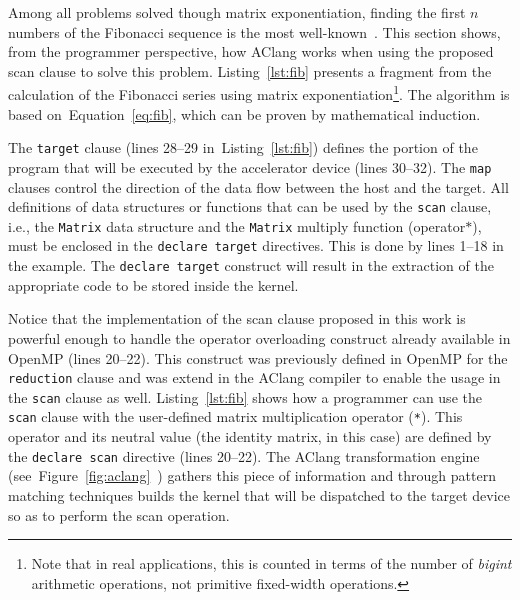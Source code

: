 \documentclass[Ingles]{ic-tese-v1}
\newcommand{\rfig}[1]{Figure~\ref{fig:#1}}
\newcommand{\req}[1]{Equation~\ref{eq:#1}}
\newcommand{\ttt}[1]{{\texttt{#1}}}
\newcommand{\rlst}[1]{Listing~\ref{lst:#1}}
\begin{document}
Among all problems solved though matrix exponentiation, finding the first $n$
numbers of the Fibonacci sequence is the most well-known~\cite{fibonacci}.
This section shows, from the programmer perspective,    how AClang works   when
using the proposed scan clause to solve this problem. \rlst{fib}  presents a
fragment from  the calculation  of the  Fibonacci series  using matrix
exponentiation\footnote{Note  that  in   real  applications,  this  is
	counted in terms of the  number of \textit{bigint} arithmetic operations, not
	primitive  fixed-width  operations.}. The algorithm  is  based  on~\req{fib},
which can be proven by mathematical induction.

The \ttt{target} clause (lines 28--29 in~\rlst{fib}) defines the portion of the
program  that will  be  executed by  the  accelerator device  (lines
30--32).  The \ttt{map}  clauses control the direction  of the data flow
between the host and the  target. All definitions of data structures
or functions  that can be used  by the \ttt{scan} clause,  i.e., the
\ttt{Matrix} data  structure and the \ttt{Matrix}  multiply function
(operator$*$),  must   be  enclosed  in  the   \ttt{declare  target}
directives. This is done by lines 1--18 in the example.  The \ttt{declare  target}
construct  will result in  the extraction of  the appropriate
code to be stored inside the kernel.

Notice that the implementation
of the  scan clause  proposed in  this work  is powerful  enough to
handle  the operator  overloading  construct  already available  in
OpenMP (lines  20--22). This construct was  previously defined in
OpenMP for the \ttt{reduction} clause  and was extend in the AClang
compiler  to enable  the usage  in  the \ttt{scan}  clause as  well.
\rlst{fib} shows how a  programmer can use the \ttt{scan}
clause   with  the   user-defined  matrix   multiplication  operator
(\ttt{*}).   This  operator  and  its neutral  value  (the  identity
matrix,  in  this  case)  are  defined  by  the  \ttt{declare  scan}
directive   (lines  20--22).    The  AClang   transformation  engine
(see~\rfig{aclang}~) gathers  this piece  of information
and through pattern matching techniques  builds the kernel that will
be  dispatched to  the  target  device so  as  to  perform the  scan
operation.
\end{document}
